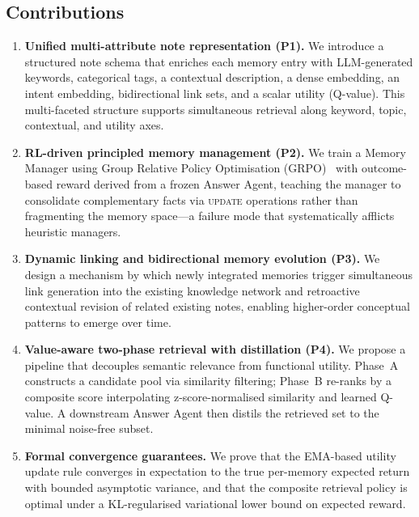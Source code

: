 \documentclass{article}
\begin{document}
\subsection{Contributions}
\label{subsec:contributions}

\begin{enumerate}[leftmargin=1.8em, label=\textbf{(\arabic*)}]

  \item \textbf{Unified multi-attribute note representation (P1).}
  We introduce a structured note schema that enriches each memory entry with
  LLM-generated keywords, categorical tags, a contextual description, a dense
  embedding, an intent embedding, bidirectional link sets, and a scalar
  utility (Q-value). This multi-faceted structure supports simultaneous
  retrieval along keyword, topic, contextual, and utility axes.

  \item \textbf{RL-driven principled memory management (P2).}
  We train a Memory Manager using Group Relative Policy Optimisation
  (GRPO)~\cite{shao2024deepseekmath} with outcome-based reward derived from a
  frozen Answer Agent, teaching the manager to consolidate complementary facts
  via \textsc{update} operations rather than fragmenting the memory
  space---a failure mode that systematically afflicts heuristic managers.

  \item \textbf{Dynamic linking and bidirectional memory evolution (P3).}
  We design a mechanism by which newly integrated memories trigger simultaneous
  link generation into the existing knowledge network and retroactive
  contextual revision of related existing notes, enabling higher-order
  conceptual patterns to emerge over time.

  \item \textbf{Value-aware two-phase retrieval with distillation (P4).}
  We propose a pipeline that decouples semantic relevance from functional
  utility. Phase~A constructs a candidate pool via similarity filtering;
  Phase~B re-ranks by a composite score interpolating z-score-normalised
  similarity and learned Q-value. A downstream Answer Agent then distils
  the retrieved set to the minimal noise-free subset.

  \item \textbf{Formal convergence guarantees.}
  We prove that the EMA-based utility update rule converges in expectation to
  the true per-memory expected return with bounded asymptotic variance, and
  that the composite retrieval policy is optimal under a KL-regularised
  variational lower bound on expected reward.

\end{enumerate}
\end{document}
